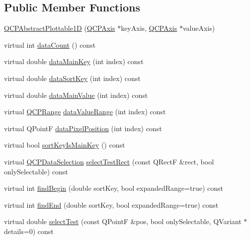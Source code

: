 \subsection*{Public Member Functions}
\begin{DoxyCompactItemize}
\item 
\hyperlink{class_q_c_p_abstract_plottable1_d_a30b2e50ab0afce65f104ea7a95440315}{Q\+C\+P\+Abstract\+Plottable1D} (\hyperlink{class_q_c_p_axis}{Q\+C\+P\+Axis} $\ast$key\+Axis, \hyperlink{class_q_c_p_axis}{Q\+C\+P\+Axis} $\ast$value\+Axis)
\item 
virtual int \hyperlink{class_q_c_p_abstract_plottable1_d_a354545da303458283df3f7948a7a768b}{data\+Count} () const
\item 
virtual double \hyperlink{class_q_c_p_abstract_plottable1_d_ab14ab428595856bf76e04499017fa8dc}{data\+Main\+Key} (int index) const
\item 
virtual double \hyperlink{class_q_c_p_abstract_plottable1_d_a6fce4e684f33a31c45928899b5d9ab4b}{data\+Sort\+Key} (int index) const
\item 
virtual double \hyperlink{class_q_c_p_abstract_plottable1_d_a0f913bb0889ca7cb574657a078fc8cff}{data\+Main\+Value} (int index) const
\item 
virtual \hyperlink{class_q_c_p_range}{Q\+C\+P\+Range} \hyperlink{class_q_c_p_abstract_plottable1_d_ac6201b01aee550ef0a240183781d1f9a}{data\+Value\+Range} (int index) const
\item 
virtual Q\+PointF \hyperlink{class_q_c_p_abstract_plottable1_d_a14cf167457cda163575e6eec2a0b178d}{data\+Pixel\+Position} (int index) const
\item 
virtual bool \hyperlink{class_q_c_p_abstract_plottable1_d_a022e8905f5a667d8379493d6a037e79f}{sort\+Key\+Is\+Main\+Key} () const
\item 
virtual \hyperlink{class_q_c_p_data_selection}{Q\+C\+P\+Data\+Selection} \hyperlink{class_q_c_p_abstract_plottable1_d_ac385c38a79e419ed3600c2ee398fd216}{select\+Test\+Rect} (const Q\+RectF \&rect, bool only\+Selectable) const
\item 
virtual int \hyperlink{class_q_c_p_abstract_plottable1_d_ae6ead74a0d6a17954e1857f361b9ccf2}{find\+Begin} (double sort\+Key, bool expanded\+Range=true) const
\item 
virtual int \hyperlink{class_q_c_p_abstract_plottable1_d_ad913df7f02add35150779dce3913aeae}{find\+End} (double sort\+Key, bool expanded\+Range=true) const
\item 
virtual double \hyperlink{class_q_c_p_abstract_plottable1_d_a071e2df66ba1746067dfcb5e27947b43}{select\+Test} (const Q\+PointF \&pos, bool only\+Selectable, Q\+Variant $\ast$details=0) const

\end{DoxyCompactItemize}
